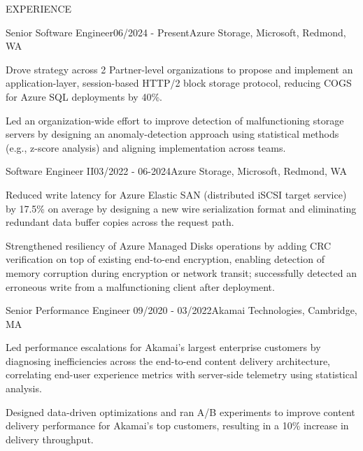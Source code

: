 \documentclass{resume}
\begin{document}
\begin{rSection}{EXPERIENCE}

    \begin{rSubsection}{Senior Software Engineer}{06/2024 - Present}{Azure
      Storage, Microsoft, Redmond, WA}{}

    \item Drove strategy across 2 Partner-level organizations to propose and
      implement an application-layer, session-based HTTP/2 block storage
      protocol, reducing COGS for Azure SQL deployments by 40\%.

    \item Led an organization-wide effort to improve detection of malfunctioning
      storage servers by designing an anomaly-detection approach using
      statistical methods (e.g., z-score analysis) and aligning implementation
      across teams.

    \end{rSubsection}

    \begin{rSubsection}{Software Engineer II}{03/2022 - 06-2024}{Azure Storage,
      Microsoft, Redmond, WA}{}

    \item Reduced write latency for Azure Elastic SAN (distributed iSCSI target
      service) by 17.5\% on average by designing a new wire serialization format
      and eliminating redundant data buffer copies across the request path.

    \item Strengthened resiliency of Azure Managed Disks operations by adding
      CRC verification on top of existing end-to-end encryption, enabling
      detection of memory corruption during encryption or network transit;
      successfully detected an erroneous write from a malfunctioning client
      after deployment.

    \end{rSubsection}

    \begin{rSubsection}{Senior Performance Engineer} {09/2020 - 03/2022}{Akamai
      Technologies, Cambridge, MA}{}

    \item Led performance escalations for Akamai’s largest enterprise customers
      by diagnosing inefficiencies across the end-to-end content delivery
      architecture, correlating end-user experience metrics with server-side
      telemetry using statistical analysis.

    \item Designed data-driven optimizations and ran A/B experiments to improve
      content delivery performance for Akamai's top customers, resulting in a
      10\% increase in delivery throughput.

    \end{rSubsection}

\end{rSection}
\end{document}
